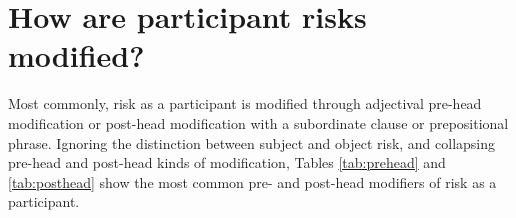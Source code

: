     \vspace{5mm}\noindent\begin{tcolorbox}[colback=yellow!5,colframe=yellow!40!black,title=Summary: processes involved when risk is a participant]
    \parbox{1\textwidth}{%
    In development.}}
    \end{tcolorbox}
    \vspace{5mm}


    \section{How are participant risks modified?}
    \FloatBarrier

    Most commonly, risk as a participant is modified through adjectival pre-head modification or post-head modification with a subordinate clause or prepositional phrase. Ignoring the distinction between subject and object risk, and collapsing pre-head and post-head kinds of modification, Tables \ref{tab:prehead} and \ref{tab:posthead} show the most common pre- and post-head modifiers of risk as a participant.

